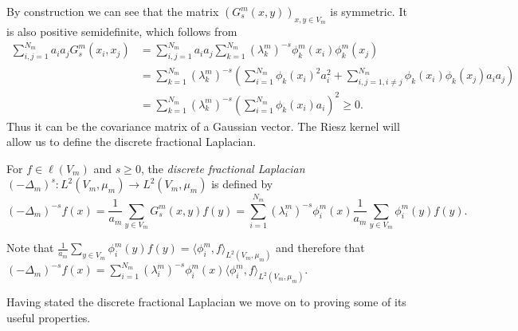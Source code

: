 By construction we can see that the matrix $\left(G_s^{m}(x,y)\right)_{x, y \in V_m}$ is symmetric. It is also positive semidefinite, which follows from
\begin{align}
	\sum_{i,j = 1}^{N_m}a_i a_j G_s^{m}(x_i, x_j) &= \sum_{i,j = 1}^{N_m}a_i a_j \sum_{k = 1}^{N_m} (\lambda_k^{m})^{-s} \phi_{k}^{m}(x_i)\phi_{k}^{m}(x_j) \\
	&=\sum_{k =1}^{N_m} (\lambda_k^{m})^{-s}  \left(\sum_{i = 1}^{N_m} \phi_k (x_i)^2 a_i^2 + \sum_{i, j = 1, i \neq j}^{N_m}\phi_k (x_i)\phi_k(x_j) a_ia_j\right) \\
	&= \sum_{k =1}^{N_m} (\lambda_k^{m})^{-s}  \left(\sum_{i = 1}^{N_m} \phi_k (x_i) a_i \right)^2 \geq 0.
\end{align}
Thus it can be the covariance matrix of a Gaussian vector. The Riesz kernel will allow us to define the discrete fractional Laplacian.
\begin{defi}\label{discreteFractionalLaplacian}
	For $f \in \ell(V_m)$ and $s \geq 0$, the \emph{discrete fractional Laplacian} \nl $(-\Delta_m)^{s}\colon L^{2}(V_m, \mu_m) \to L^{2}(V_m, \mu_m)$ is defined by
	\begin{equation}
		(-\Delta_{m})^{-s}f(x) = \frac{1}{a_m} \sum_{y \in V_m} G_{s}^{m}(x,y)f(y) = \sum_{i = 1}^{N_m} (\lambda_{i}^{m})^{-s} \phi_{i}^{m}(x) \frac{1}{a_m} \sum_{y \in V_m} \phi_{i}^{m}(y)f(y).
	\end{equation}
\end{defi}
\begin{remark}
	Note that $\frac{1}{a_m} \sum_{y \in V_m} \phi_{i}^{m}(y)f(y) = \langle\phi^{m}_i,f \rangle_{L^{2}(V_m, \mu_m)}$ and therefore that \nl $(-\Delta_{m})^{-s}f(x) = \sum_{i = 1}^{N_m} (\lambda_{i}^{m})^{-s} \phi_{i}^{m}(x) \langle \phi_i^{m},f \rangle_{L^2(V_m, \mu_m)}$.
\end{remark}

Having stated the discrete fractional Laplacian we move on to proving some of its useful properties.

